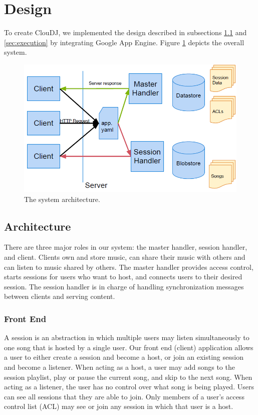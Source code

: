 \section{Design}
\label{sec:design}
To create ClouDJ, we implemented the design described 
in subsections \ref{sec:architecture} and \ref{sec:execution} 
by integrating Google App Engine. 
Figure \ref{fig:arch} depicts the overall system.

\begin{figure}[ht]
\centering
\includegraphics[width=160mm]{architecture.png}
\caption{The system architecture.}
\label{fig:arch}
\end{figure}

\subsection{Architecture}
\label{sec:architecture}
There are three major roles in our system: 
the master handler, session handler, and client. Clients own 
and store music, can share their music with others 
and can listen to music shared by others. The master handler provides 
access control, starts sessions for users who want to host, and
connects users to their desired session. The session 
handler is in charge of handling synchronization messages between clients
and serving content.

\subsubsection{Front End}
\label{sec:frontend}
A session is an abstraction in which multiple users 
may listen simultaneously to one song that is hosted by a single user. 
Our front end (client) application allows a user to either 
create a session and become a host, or join an existing 
session and become a listener. When acting as a host, 
a user may add songs to the session playlist, 
play or pause the current song, and skip to the next song. 
When acting as a listener, the user has 
no control over what song is being played. Users can 
see all sessions that they are able to join. Only 
members of a user's access control list (ACL) may 
see or join any session in which that user is a host.

